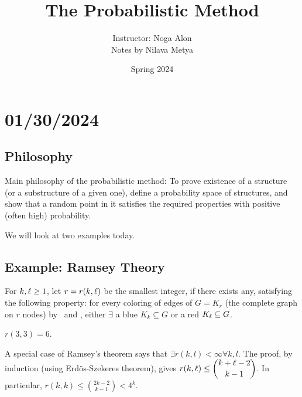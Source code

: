 
\newcommand{\eto}{\stackrel{=}{\to}}
\selectfont 
\usepackage[
backend=biber,
style=alphabetic,%
citestyle=ieee-alphabetic,
maxnames=10,
sorting=ynt
]{biblatex}

\title{The Probabilistic Method}
\usepackage{quiver}
\author{Instructor: Noga Alon\\Notes by Nilava Metya}
\date{Spring 2024}
\makeatletter
\renewcommand{\@chapapp}{Lecture}
\makeatother



\maketitle
\tableofcontents

\chapter{01/30/2024}

\section{Philosophy}
Main philosophy of the probabilistic method: To prove existence of a structure (or a substructure of a given one), define a probability space of structures, and show that a random point in it satisfies the required properties with positive (often high) probability.

We will look at two examples today.

\section{Example: Ramsey Theory}

\begin{defn}
For $k,\ell\geq 1$, let $r=r(k,\ell)$ be the smallest integer, if there exists any, satisfying the following property: for every coloring of edges of $G=K_r$ (the complete graph on $r$ nodes) by \red~and \blue, either $\exists$ a  blue $K_k\subseteq G$ or a red $K_{\ell}\subseteq G$.
\end{defn}
\begin{ex}
$r(3,3)=6$.
\end{ex}

A special case of Ramsey's theorem says that $\exists r(k,l)<\infty\forall k,l$. The proof, by induction (using Erd\"os-Szekeres theorem), gives $\displaystyle r(k,\ell)\leq\binom{k+\ell-2}{k-1}$. In particular, $r(k,k) \leq \binom{2k-2}{k-1} <4^k$.

